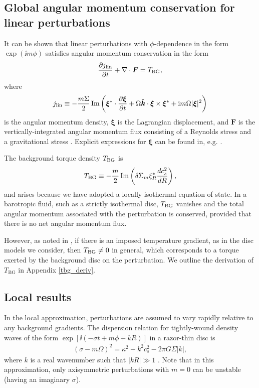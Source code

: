 \subsection{Global angular momentum conservation for linear
  perturbations} 
It can be shown that linear perturbations with $\phi$-dependence in the form
$\exp{(\ii m\phi)}$ satisfies angular momentum conservation
in the form 
\begin{align} 
  \frac{\partial j_\mathrm{lin}}{\partial t} + \nabla\cdot\bm{F} = T_\mathrm{BG}, 
\end{align}
\citep[e.g.][]{narayan87,ryu92,lin93b} where
\begin{align}\label{lin_ang_mom_cons}
  j_\mathrm{lin} \equiv
  -\frac{m\Sigma}{2}\operatorname{Im}\left(\bm{\xi}^*\cdot\frac{\partial\bm{\xi}}{\partial
      t} + \Omega \hat{\bm{k}}\cdot\bm{\xi}\times\bm{\xi}^* + \mathrm{i}
    m \Omega |\bm{\xi}|^2\right) 
\end{align}
is the angular momentum density, $\bm{\xi}$ is the Lagrangian
displacement, and $\bm{F}$ is the vertically-integrated angular
momentum flux consisting of a Reynolds stress and a gravitational
stress \citep{lin11b}. Explicit expressions for $\bm{\xi}$ can be found in,
e.g. \cite{papaloizou85}. 



The background torque density $T_\mathrm{BG}$ is 
\begin{align}\label{baroclinic_torque}
  T_\mathrm{BG} \equiv
  -\frac{m}{2}\operatorname{Im}\left(\delta\Sigma_m\xi_R^*\frac{dc_s^2}{dR}\right), 
\end{align}
and arises because we have adopted a locally isothermal equation of
state. In a barotropic fluid, such as a strictly isothermal disc,
$T_\mathrm{BG}$ vanishes and the total angular momentum associated with
the perturbation is conserved, provided that there is no net angular
momentum flux.%

However, as noted in \cite{lin11b}, if there is an imposed
temperature gradient, as in the disc models we consider,
then $T_\mathrm{BG}\neq 0$ in general, which corresponds to a torque
exerted by the background disc on the perturbation. We 
outline the derivation of $T_\mathrm{BG}$ in Appendix 
\ref{tbg_deriv}. 

\subsection{Local results}
In the local approximation, perturbations are assumed to vary rapidly
relative to any background gradients. The
dispersion relation for tightly-wound density 
waves of the form $\exp{[\ii(-\sigma t + m \phi + kR)]}$ in a razor-thin
disc is  
\begin{align}\label{dispersion}
  (\sigma - m\Omega)^2 = \kappa^2 + k^2c_s^2 - 2\pi G \Sigma |k|, 
\end{align}
where $k$ is a real wavenumber such that $|kR|\gg1$ \citep{shu91}. 
Note that in this approximation, only axisymmetric perturbations with
$m=0$ can be unstable (having an imaginary $\sigma$).    

